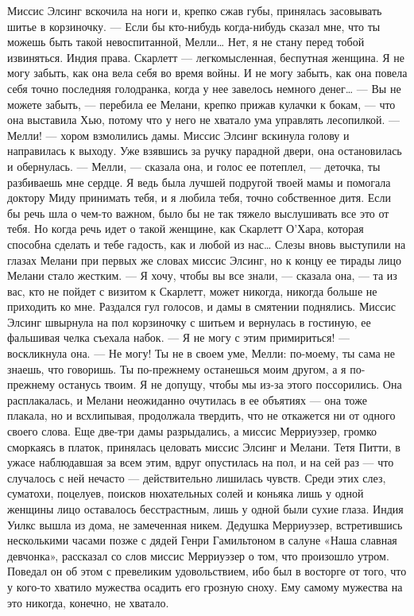 Миссис Элсинг вскочила на ноги и, крепко сжав губы, принялась засовывать шитье в корзиночку.
— Если бы кто-нибудь когда-нибудь сказал мне, что ты можешь быть такой невоспитанной, Мелли… Нет, я не стану перед тобой извиняться. Индия права. Скарлетт — легкомысленная, беспутная женщина. Я не могу забыть, как она вела себя во время войны. И не могу забыть, как она повела себя точно последняя голодранка, когда у нее завелось немного денег…
— Вы не можете забыть, — перебила ее Мелани, крепко прижав кулачки к бокам, — что она выставила Хью, потому что у него не хватало ума управлять лесопилкой.
— Мелли! — хором взмолились дамы. Миссис Элсинг вскинула голову и направилась к выходу. Уже взявшись за ручку парадной двери, она остановилась и обернулась.
— Мелли, — сказала она, и голос ее потеплел, — деточка, ты разбиваешь мне сердце. Я ведь была лучшей подругой твоей мамы и помогала доктору Миду принимать тебя, и я любила тебя, точно собственное дитя. Если бы речь шла о чем-то важном, было бы не так тяжело выслушивать все это от тебя. Но когда речь идет о такой женщине, как Скарлетт О’Хара, которая способна сделать и тебе гадость, как и любой из нас…
Слезы вновь выступили на глазах Мелани при первых же словах миссис Элсинг, но к концу ее тирады лицо Мелани стало жестким.
— Я хочу, чтобы вы все знали, — сказала она, — та из вас, кто не пойдет с визитом к Скарлетт, может никогда, никогда больше не приходить ко мне.
Раздался гул голосов, и дамы в смятении поднялись. Миссис Элсинг швырнула на пол корзиночку с шитьем и вернулась в гостиную, ее фальшивая челка съехала набок.
— Я не могу с этим примириться! — воскликнула она. — Не могу! Ты не в своем уме, Мелли: по-моему, ты сама не знаешь, что говоришь. Ты по-прежнему останешься моим другом, а я по-прежнему останусь твоим. Я не допущу, чтобы мы из-за этого поссорились.
Она расплакалась, и Мелани неожиданно очутилась в ее объятиях — она тоже плакала, но и всхлипывая, продолжала твердить, что не откажется ни от одного своего слова. Еще две-три дамы разрыдались, а миссис Мерриуэзер, громко сморкаясь в платок, принялась целовать миссис Элсинг и Мелани. Тетя Питти, в ужасе наблюдавшая за всем этим, вдруг опустилась на пол, и на сей раз — что случалось с ней нечасто — действительно лишилась чувств. Среди этих слез, суматохи, поцелуев, поисков нюхательных солей и коньяка лишь у одной женщины лицо оставалось бесстрастным, лишь у одной были сухие глаза. Индия Уилкс вышла из дома, не замеченная никем.
Дедушка Мерриуэзер, встретившись несколькими часами позже с дядей Генри Гамильтоном в салуне «Наша славная девчонка», рассказал со слов миссис Мерриуэзер о том, что произошло утром. Поведал он об этом с превеликим удовольствием, ибо был в восторге от того, что у кого-то хватило мужества осадить его грозную сноху. Ему самому мужества на это никогда, конечно, не хватало.
